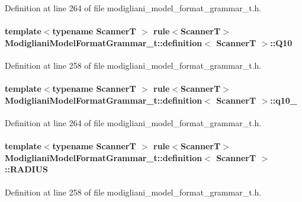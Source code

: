 Definition at line 264 of file modigliani\_\-model\_\-format\_\-grammar\_\-t.h.

\paragraph[{Q10}]{\setlength{\rightskip}{0pt plus 5cm}template$<$typename ScannerT $>$ rule$<$ScannerT$>$ {\bf ModiglianiModelFormatGrammar\_\-t::definition}$<$ ScannerT $>$::{\bf Q10}}\hfill\label{struct_modigliani_model_format_grammar__t_1_1definition_a2331311b1ca73e00b39761e37e07ef64}


Definition at line 258 of file modigliani\_\-model\_\-format\_\-grammar\_\-t.h.

\paragraph[{q10\_\-}]{\setlength{\rightskip}{0pt plus 5cm}template$<$typename ScannerT $>$ rule$<$ScannerT$>$ {\bf ModiglianiModelFormatGrammar\_\-t::definition}$<$ ScannerT $>$::{\bf q10\_\-}}\hfill\label{struct_modigliani_model_format_grammar__t_1_1definition_a6c2671de8e754906131d75b61416ed40}


Definition at line 264 of file modigliani\_\-model\_\-format\_\-grammar\_\-t.h.

\paragraph[{RADIUS}]{\setlength{\rightskip}{0pt plus 5cm}template$<$typename ScannerT $>$ rule$<$ScannerT$>$ {\bf ModiglianiModelFormatGrammar\_\-t::definition}$<$ ScannerT $>$::{\bf RADIUS}}\hfill\label{struct_modigliani_model_format_grammar__t_1_1definition_a985aabd916cecfa92c7e62f9fe8941fe}


Definition at line 258 of file modigliani\_\-model\_\-format\_\-grammar\_\-t.h.

